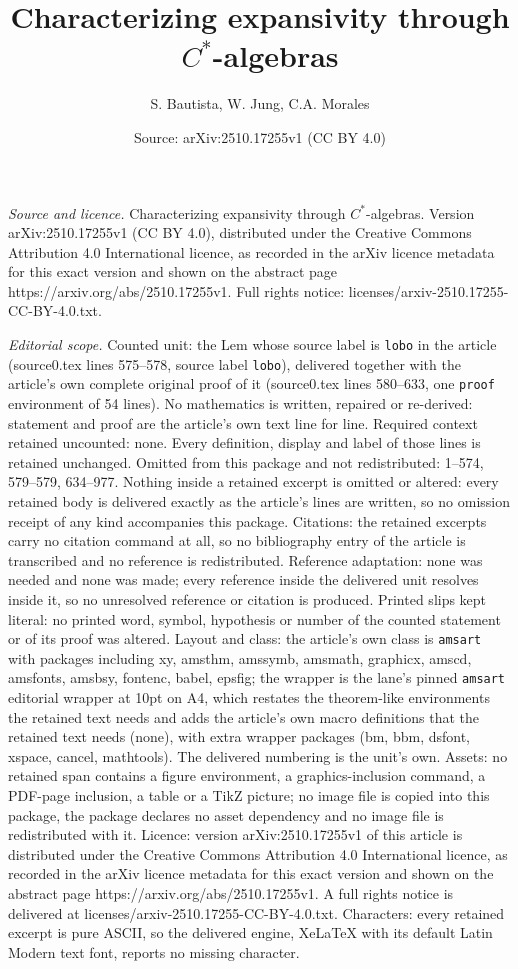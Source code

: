\documentclass[10pt,a4paper]{amsart}
\title[Characterizing expansivity through $C^*$-algebras]{Characterizing expansivity through $C^*$-algebras}
\author{S. Bautista, W. Jung, C.A. Morales}
\date{Source: arXiv:2510.17255v1 (CC BY 4.0)}
\begin{document}
\maketitle

\noindent\emph{Source and licence.} Characterizing expansivity through $C^*$-algebras. Version arXiv:2510.17255v1 (CC BY 4.0), distributed under the Creative Commons Attribution 4.0 International licence, as recorded in the arXiv licence metadata for this exact version and shown on the abstract page https://arxiv.org/abs/2510.17255v1. Full rights notice: licenses/arxiv-2510.17255-CC-BY-4.0.txt.\par\smallskip

\noindent\textit{Editorial scope.} Counted unit: the Lem whose source label is \texttt{lobo} in the article (source0.tex lines 575--578, source label \texttt{lobo}), delivered together with the article's own complete original proof of it (source0.tex lines 580--633, one \texttt{proof} environment of 54 lines). No mathematics is written, repaired or re-derived: statement and proof are the article's own text line for line. Required context retained uncounted: none. Every definition, display and label of those lines is retained unchanged. Omitted from this package and not redistributed: 1--574, 579--579, 634--977. Nothing inside a retained excerpt is omitted or altered: every retained body is delivered exactly as the article's lines are written, so no omission receipt of any kind accompanies this package. Citations: the retained excerpts carry no citation command at all, so no bibliography entry of the article is transcribed and no reference is redistributed. Reference adaptation: none was needed and none was made; every reference inside the delivered unit resolves inside it, so no unresolved reference or citation is produced. Printed slips kept literal: no printed word, symbol, hypothesis or number of the counted statement or of its proof was altered. Layout and class: the article's own class is \texttt{amsart} with packages including xy, amsthm, amssymb, amsmath, graphicx, amscd, amsfonts, amsbsy, fontenc, babel, epsfig; the wrapper is the lane's pinned \texttt{amsart} editorial wrapper at 10pt on A4, which restates the theorem-like environments the retained text needs and adds the article's own macro definitions that the retained text needs (none), with extra wrapper packages (bm, bbm, dsfont, xspace, cancel, mathtools). The delivered numbering is the unit's own. Assets: no retained span contains a figure environment, a graphics-inclusion command, a PDF-page inclusion, a table or a TikZ picture; no image file is copied into this package, the package declares no asset dependency and no image file is redistributed with it. Licence: version arXiv:2510.17255v1 of this article is distributed under the Creative Commons Attribution 4.0 International licence, as recorded in the arXiv licence metadata for this exact version and shown on the abstract page https://arxiv.org/abs/2510.17255v1. A full rights notice is delivered at licenses/arxiv-2510.17255-CC-BY-4.0.txt. Characters: every retained excerpt is pure ASCII, so the delivered engine, XeLaTeX with its default Latin Modern text font, reports no missing character.
\end{document}
